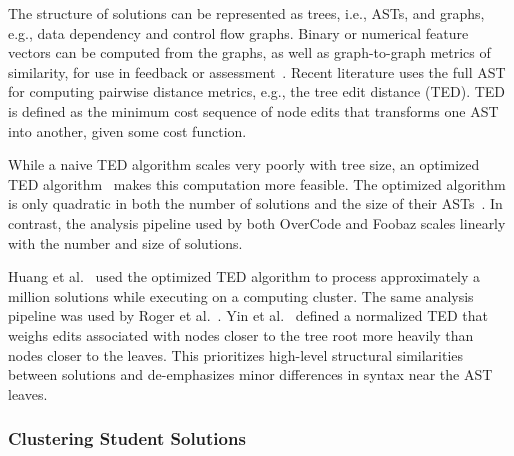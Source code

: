 
The structure of solutions can be represented as trees, i.e., ASTs, and graphs, e.g., data dependency and control flow graphs. Binary or numerical feature vectors can be computed from the graphs, as well as graph-to-graph metrics of similarity, for use in feedback or assessment~\cite{Robinson:1980,srikant2014system}. Recent literature uses the full AST for computing pairwise distance metrics, e.g., the tree edit distance (TED). TED is defined as the minimum cost sequence of node edits that transforms one AST into another, given some cost function.


While a naive TED algorithm scales very poorly with tree size, an optimized TED algorithm~\cite{shasha1994exact} makes this computation more feasible. The optimized algorithm is only quadratic in both the number of solutions and the size of their ASTs~\cite{MOOCshop}. In contrast, the analysis pipeline used by both OverCode and Foobaz scales linearly with the number and size of solutions. 

Huang et al.~\cite{MOOCshop} used the optimized TED algorithm to process approximately a million solutions while executing on a computing cluster. The same analysis pipeline was used by Roger et al.~\cite{ACESthesis}. Yin et al.~\cite{yin2015clustering} defined a normalized TED that weighs edits associated with nodes closer to the tree root more heavily than nodes closer to the leaves. This prioritizes high-level structural similarities between solutions and de-emphasizes minor differences in syntax near the AST leaves.




\subsubsection{Clustering Student Solutions}


